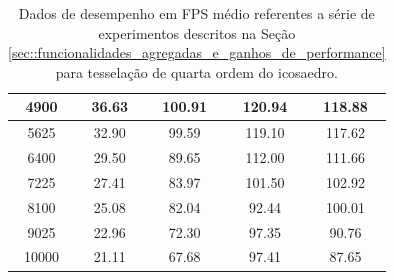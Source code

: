 \documentclass[
    12pt,                %
    oneside,            %
    a4paper,            %
    english,            %
    french,                %
    spanish,            %
    brazil                %
    ]{abntex2}
\begin{document}
\begin{apendicesenv}
\begin{table}[htb]
\begin{tabular}{c|c|c|c|c|}
\multicolumn{1}{|c|}{4900}      &   36.63              & 100.91         & 120.94                & 118.88              \\ \hline
\multicolumn{1}{|c|}{5625}      &   32.90              &  99.59         & 119.10                & 117.62              \\ \hline
\multicolumn{1}{|c|}{6400}      &   29.50              &  89.65         & 112.00                & 111.66              \\ \hline
\multicolumn{1}{|c|}{7225}      &   27.41              &  83.97         & 101.50                & 102.92              \\ \hline
\multicolumn{1}{|c|}{8100}      &   25.08              &  82.04         &  92.44                & 100.01              \\ \hline
\multicolumn{1}{|c|}{9025}      &   22.96              &  72.30         &  97.35                &  90.76              \\ \hline
\multicolumn{1}{|c|}{10000}     &   21.11              &  67.68         &  97.41                &  87.65              \\ \hline
\end{tabular}
\caption{Dados de desempenho em FPS médio referentes a série de experimentos descritos na Seção \ref{sec::funcionalidades_agregadas_e_ganhos_de_performance} para tesselação de quarta ordem do icosaedro.}
\label{tab::testes_4}
\end{table}


\end{apendicesenv}
\end{document}
